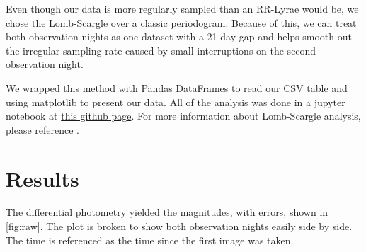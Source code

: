 \documentclass[%
aip,
jmp,
reprint,
floatfix,
nofootinbib
]{revtex4-1}
\begin{document}
	Even though our data is more regularly sampled than an RR-Lyrae would be, we chose the Lomb-Scargle over a classic periodogram. Because of this, we can treat both observation nights as one dataset with a 21 day gap and helps smooth out the irregular sampling rate caused by small interruptions on the second observation night.
	
	 We wrapped this method with Pandas DataFrames to read our CSV table and using matplotlib to present our data. All of the analysis was done in a jupyter notebook at \href{https://github.com/mileslucas/astro344l/blob/master/project/src/project.ipynb}{this github page}. For more information about Lomb-Scargle analysis, please reference \citet{2017arXiv170309824V}.


	
	\section{Results}
	
	The differential photometry yielded the magnitudes, with errors, shown in \autoref{fig:raw}. The plot is broken to show both observation nights easily side by side. The time is referenced as the time since the first image was taken. 
	
\end{document}
